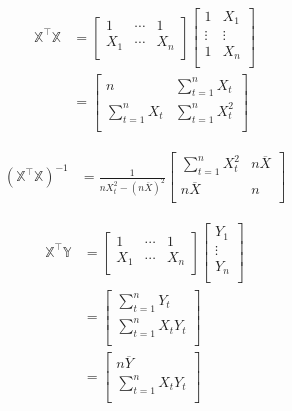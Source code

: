 \documentclass[11pt,french]{report}
\begin{document}
\begin{align*}
\mathbb{X}^\intercal \mathbb{X} &=
\begin{bmatrix} 
1 & \cdots & 1 \\
X_1  & \cdots & X_{n} \\ 
\end{bmatrix}
\begin{bmatrix} 
1 & X_{1} \\
\vdots & \vdots  \\
1 & X_{n} \\ 
\end{bmatrix} \\
&= 
\begin{bmatrix} 
n & \displaystyle\sum_{t=1}^n X_{t} \\
\displaystyle\sum_{t=1}^n X_{t} & \displaystyle\sum_{t=1}^n X_{t}^2 \\ 
\end{bmatrix}
\end{align*}

\begin{align*}
(\mathbb{X}^\intercal \mathbb{X})^{-1} &=
\frac{1}{n X_{t}^2 - (n \overline{X})^2}
\begin{bmatrix} 
\displaystyle\sum_{t=1}^n X_{t}^2  & n \overline{X} \\
n \overline{X} & n \\ 
\end{bmatrix}
\end{align*}

\begin{align*}
\mathbb{X}^\intercal \mathbb{Y} &=
\begin{bmatrix} 
1 & \cdots & 1 \\
X_1  & \cdots & X_{n} \\ 
\end{bmatrix} 
\begin{bmatrix} 
Y_{1} \\
\vdots  \\
Y_{n} \\ 
\end{bmatrix} \\
&=
\begin{bmatrix} 
\displaystyle\sum_{t=1}^n Y_{t} \\
\displaystyle\sum_{t=1}^n X_t Y_{t} \\ 
\end{bmatrix} \\
&= 
\begin{bmatrix} 
n \overline{Y} \\
\displaystyle\sum_{t=1}^n X_t Y_{t} \\ 
\end{bmatrix} \\
\end{align*}
\end{document}
